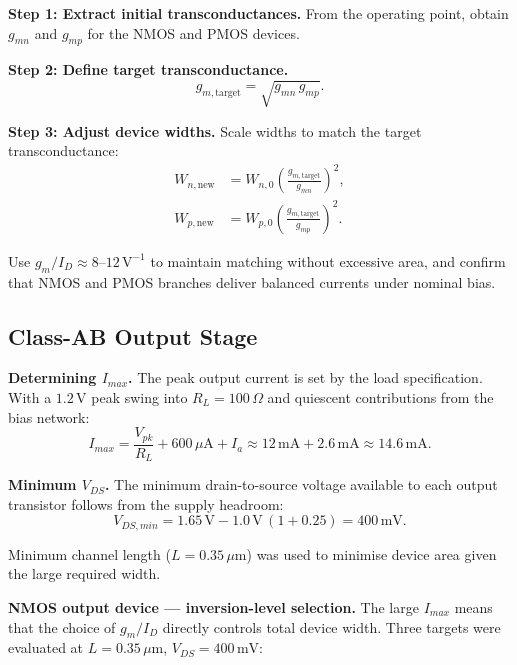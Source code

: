 \documentclass[conference]{IEEEtran}
\begin{document}
\textbf{Step 1: Extract initial transconductances.}
From the operating point, obtain $g_{mn}$ and $g_{mp}$ for the NMOS and PMOS devices.

\textbf{Step 2: Define target transconductance.}
\begin{equation}
  g_{m,\text{target}} = \sqrt{g_{mn}\,g_{mp}}.
\end{equation}

\textbf{Step 3: Adjust device widths.}
Scale widths to match the target transconductance:
\begin{align}
  W_{n,\text{new}} &= W_{n,0}\!\left(\frac{g_{m,\text{target}}}{g_{mn}}\right)^{\!2}, \\
  W_{p,\text{new}} &= W_{p,0}\!\left(\frac{g_{m,\text{target}}}{g_{mp}}\right)^{\!2}.
\end{align}

Use $g_m/I_D \approx 8$--$12\,\text{V}^{-1}$ to maintain matching without
excessive area, and confirm that NMOS and PMOS branches deliver balanced
currents under nominal bias.

\subsection{Class-AB Output Stage}

\textbf{Determining $I_{max}$.}
The peak output current is set by the load specification.  With a
$1.2\,\text{V}$ peak swing into $R_L = 100\,\Omega$ and quiescent
contributions from the bias network:
\begin{equation}
  I_{max} = \frac{V_{pk}}{R_L} + 600\,\mu\text{A} + I_a
           \approx 12\,\text{mA} + 2.6\,\text{mA} \approx 14.6\,\text{mA}.
  \label{eq:imax}
\end{equation}

\textbf{Minimum $V_{DS}$.}
The minimum drain-to-source voltage available to each output transistor
follows from the supply headroom:
\begin{equation}
  V_{DS,min} = 1.65\,\text{V} - 1.0\,\text{V}\,(1 + 0.25) = 400\,\text{mV}.
  \label{eq:vdsmin}
\end{equation}

Minimum channel length ($L = 0.35\,\mu\text{m}$) was used to minimise device
area given the large required width.

\textbf{NMOS output device --- inversion-level selection.}
The large $I_{max}$ means that the choice of $g_m/I_D$ directly controls
total device width.  Three targets were evaluated at
$L = 0.35\,\mu\text{m}$, $V_{DS} = 400\,\text{mV}$:
\end{document}

